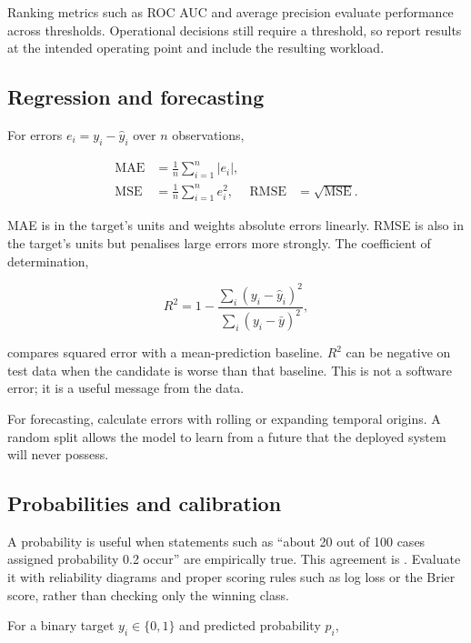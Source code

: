 Ranking metrics such as ROC AUC and average precision evaluate performance
across thresholds.
Operational decisions still require a threshold, so report results at the
intended operating point and include the resulting workload.

\subsection{Regression and forecasting}

For errors $e_i=y_i-\hat y_i$ over $n$ observations,

\begin{align}
    \operatorname{MAE} &= \frac{1}{n}\sum_{i=1}^{n}|e_i|,
    \label{eq:mae}\\
    \operatorname{MSE} &= \frac{1}{n}\sum_{i=1}^{n}e_i^2,
    &\operatorname{RMSE} &= \sqrt{\operatorname{MSE}}.
    \label{eq:mse-rmse}
\end{align}

MAE is in the target's units and weights absolute errors linearly.
RMSE is also in the target's units but penalises large errors more strongly.
The coefficient of determination,

\begin{equation}
    R^2 = 1 -
    \frac{\sum_i(y_i-\hat y_i)^2}
         {\sum_i(y_i-\bar y)^2},
    \label{eq:r-squared}
\end{equation}

compares squared error with a mean-prediction baseline.
$R^2$ can be negative on test data when the candidate is worse than that
baseline.
This is not a software error; it is a useful message from the data.

For forecasting, calculate errors with rolling or expanding temporal origins.
A random split allows the model to learn from a future that the deployed
system will never possess.

\subsection{Probabilities and calibration}

A probability is useful when statements such as ``about 20 out of 100 cases
assigned probability 0.2 occur'' are empirically true.
This agreement is .
Evaluate it with reliability diagrams and proper scoring rules such as log
loss or the Brier score, rather than checking only the winning class.

For a binary target $y_i\in\{0,1\}$ and predicted probability $p_i$,

